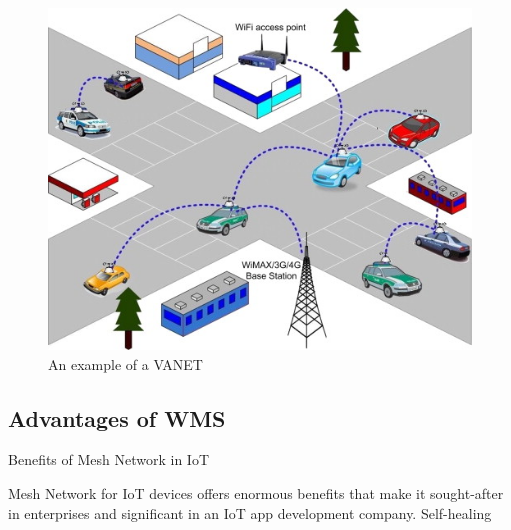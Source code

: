 		\begin{minipage}{0.48\textwidth}\raggedright
			\begin{figure}[H]
				\centering
				\includegraphics[width=\textwidth]{resources/img/chap4/vanet}
				\caption[An example of a VANET]{An example of a VANET \cite{BADIS2015653}}
				\label{img:vanet}
			\end{figure}
		\end{minipage}
	
		
		
	
	
	
	
		\subsection{Advantages of WMS}
		
			Benefits of Mesh Network in IoT
			
			Mesh Network for IoT devices offers enormous benefits that make it sought-after in enterprises and significant in an IoT app development company.
			Self-healing
			
